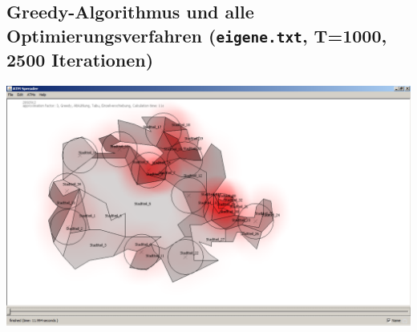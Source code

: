 \documentclass[12pt,a4paper]{article}
\begin{document}
\subsection{Greedy-Algorithmus und alle Optimierungsverfahren (\texttt{eigene.txt}, T=1000, 2500 Iterationen)}
\includegraphics[width=1.0\textwidth]{eigene_alles.pdf}
\end{document}
